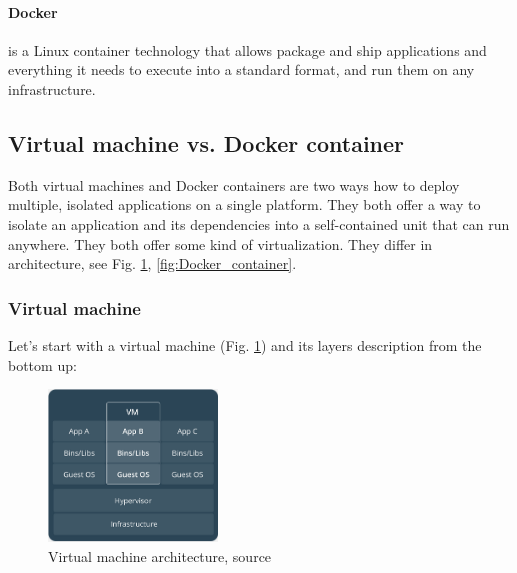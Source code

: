 \documentclass{gifce}
\begin{document}
\paragraph{Docker} is a Linux container technology that allows package and ship applications and everything it needs to
execute into a standard format, and run them on any infrastructure.

\subsection{Virtual machine vs. Docker container}
Both virtual machines and Docker containers are two ways how to deploy multiple, isolated applications on a single 
platform. They both offer a way to isolate an application and its dependencies into a self-contained unit that can run 
anywhere. They both offer some kind of virtualization. They differ in architecture, see Fig. \ref{fig:Docker_VM}, 
\ref{fig:Docker_container}.

\subsubsection{Virtual machine}
Let's start with a virtual machine (Fig. \ref{fig:Docker_VM}) and its layers description from the bottom up:

\begin{figure}[h!]
\centering
\includegraphics[width=0.4\textwidth]{img/Docker_VM.png}
\caption{Virtual machine architecture, source \cite{Docker_docs}}
\label{fig:Docker_VM}
\end{figure}
\end{document}
